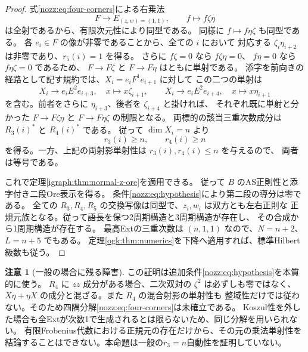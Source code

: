 \documentclass[11pt,a4paper]{ltjsarticle}
\theoremstyle{definition}
\newtheorem{remark}[theorem]{注意}
\begin{document}
\begin{proof}
式\eqref{nozz:eq:four-corners}による右乗法
\[
 F\longrightarrow E_{(z,w)=(1,1)},\qquad f\longmapsto f\zeta\eta
\]
は全射であるから、有限次元性により同型である。
同様に $f\mapsto f\eta\zeta$ も同型である。
各 $e_i\in F$ の像が非零であることから、全ての $i$ において
対応する $\zeta_i\eta_{i+2}$ は非零であり、$r_5(i)=1$ を得る。
さらに $f\zeta=0$ なら $f\zeta\eta=0$、
$f\eta=0$ なら $f\eta\zeta=0$ であるため、
$F\to F\zeta$ と $F\to F\eta$ はともに単射である。
添字を前向きの経路として記す規約では、$X_i=e_iF^1e_{i+1}$ に対して
この二つの単射は
\[
 X_i\longrightarrow e_iE^2e_{i+3},\quad x\longmapsto x\zeta_{i+1},
 \qquad
 X_i\longrightarrow e_iE^2e_{i+4},\quad x\longmapsto x\eta_{i+1}
\]
を含む。前者をさらに $\eta_{i+3}$、後者を $\zeta_{i+4}$ と掛ければ、
それぞれ既に単射と分かった $F\to F\zeta\eta$ と $F\to F\eta\zeta$ の制限となる。
両標的の該当三重次数成分は $R_3(i)^*$ と $R_4(i)^*$ である。
従って $\dim X_i=n$ より
\[
 r_3(i)\ge n,\qquad r_4(i)\ge n
\]
を得る。一方、上記の両射影単射性は $r_3(i),r_4(i)\le n$ を与えるので、
両者は等号である。

これで定理\ref{igraph:thm:normal-z-ore}を適用できる。
従って $B$ のAS正則性と添字付き二段Ore表示を得る。
条件\eqref{nozz:eq:hypothesis}により第二段の導分は零である。
全ての $R_3,R_4,R_5$ の交換写像は同型で、$z_i,w_i$ は双方とも左右正則な
正規元族となる。従って語長を保つ2周期構造と3周期構造が存在し、
その合成から1周期構造が存在する。
最高Extの三重次数は $(n,1,1)$ なので、$N=n+2$、$L=n+5$ でもある。
定理\ref{ogk:thm:numerics}を下降へ適用すれば、標準Hilbert級数も従う。
\end{proof}

\begin{remark}[一般の場合に残る障害]
この証明は追加条件\eqref{nozz:eq:hypothesis}を本質的に使う。
$R_4$ に $zz$ 成分がある場合、二次双対の $\zeta^2$ は必ずしも零ではなく、
$X\eta+\eta X$ の成分と混ざる。また $R_4$ の混合射影の単射性も
整域性だけでは従わない。そのため四隅分解\eqref{nozz:eq:four-corners}は未確立である。
Koszul性を外した場合も全Extが次数1で生成されるとは限らないため、同じ分解を用いられない。
有限Frobenius代数における正規元の存在だけから、その元の乗法単射性を
結論することはできない。本命題は一般の$r_3=n$自動性を証明していない。
\end{remark}
\end{document}
